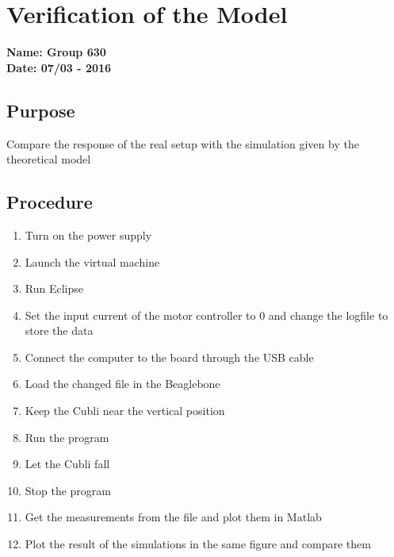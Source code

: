 \chapter{Verification of the Model}

\textbf{Name: Group 630}\\
\textbf{Date: 07/03 - 2016}

\section*{Purpose}
Compare the response of the real setup with the simulation given by the theoretical model

\section*{Procedure}
\begin{enumerate}
	\item{Turn on the power supply}
	\item{Launch the virtual machine}
	\item{Run Eclipse}
	\item{Set the input current of the motor controller to 0 and change the logfile to store the data}
	\item{Connect the computer to the board through the USB cable}
	\item{Load the changed file in the Beaglebone}
	\item{Keep the Cubli near the vertical position}
	\item{Run the program}
	\item{Let the Cubli fall}
	\item{Stop the program}
	\item{Get the measurements from the file and plot them in Matlab}
	\item{Plot the result of the simulations in the same figure and compare them}
\end{enumerate}


